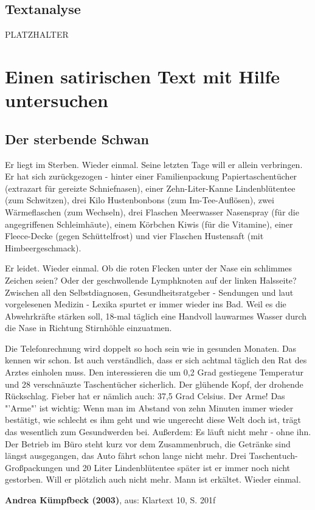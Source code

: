 \documentclass[12pt,a4paper]{scrartcl}
\begin{document}
\subsection{Textanalyse} 
PLATZHALTER


\section{Einen satirischen Text mit Hilfe untersuchen}
\begin{linenumbers} 
\subsection*{Der sterbende Schwan} 
Er liegt im Sterben. Wieder einmal. Seine letzten Tage will er allein verbringen. Er hat sich zurückgezogen - hinter einer Familienpackung Papiertaschentücher (extrazart für gereizte Schniefnasen), einer Zehn-Liter-Kanne Lindenblütentee (zum Schwitzen), drei Kilo Hustenbonbons (zum Im-Tee-Auflösen), zwei Wärmeflaschen (zum Wechseln), drei Flaschen Meerwasser Nasenspray (für die angegriffenen Schleimhäute), einem Körbchen Kiwis (für die Vitamine), einer Fleece-Decke (gegen Schüttelfrost) und vier Flaschen Hustensaft (mit Himbeergeschmack).

Er leidet. Wieder einmal. Ob die roten Flecken unter der Nase ein schlimmes Zeichen seien? Oder der geschwollende Lymphknoten auf der linken Halsseite? Zwischen all den Selbstdiagnosen, Gesundheitsratgeber - Sendungen und laut vorgelesenen Medizin - Lexika spurtet er immer wieder ins Bad. Weil es die Abwehrkräfte stärken soll, 18-mal täglich eine Handvoll lauwarmes Wasser durch die Nase in Richtung Stirnhöhle einzuatmen.

Die Telefonrechnung wird doppelt so hoch sein wie in gesunden Monaten. Das kennen wir schon. Ist auch verständlich, dass er sich achtmal täglich den Rat des Arztes einholen muss. Den interessieren die um 0,2 Grad gestiegene Temperatur und 28 verschnäuzte Taschentücher sicherlich. Der glühende Kopf, der drohende Rückschlag. Fieber hat er nämlich auch: 37,5 Grad Celsius. Der Arme! Das "'Arme"' ist wichtig: Wenn man im Abstand von zehn Minuten immer wieder bestätigt, wie schlecht es ihm geht und wie ungerecht diese Welt doch ist, trägt das wesentlich zum Gesundwerden bei. Außerdem: Es läuft nicht mehr - ohne ihn. Der Betrieb im Büro steht kurz vor dem Zusammenbruch, die Getränke sind längst ausgegangen, das Auto fährt schon lange nicht mehr. Drei Taschentuch-Großpackungen und 20 Liter Lindenblütentee später ist er immer noch nicht gestorben. Will er plötzlich auch nicht mehr. Mann ist erkältet. Wieder einmal.
\end{linenumbers}
\textbf{Andrea Kümpfbeck (2003)}, aus: Klartext 10, S. 201f
\end{document}
